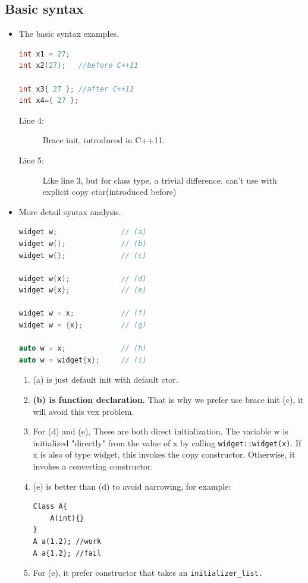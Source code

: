 \documentclass[a4paper,11pt,twoside]{book}
\begin{document}
\subsection{Basic syntax}
\begin{itemize}
	
	\item The basic syntax examples. 
\begin{lstlisting}[frame=single, language=c++,mathescape=true]
int x1 = 27;  
int x2(27);   //before C++11

int x3{ 27 }; //after C++11
int x4={ 27 }; 
\end{lstlisting}
\begin{description}
	\item[Line 4:] Brace init, introduced in C++11.
	\item[Line 5:] Like line 3, but for class type, a trivial difference. can't use with explicit copy ctor(introduced before)
\end{description}
	
\item More detail syntax analysis.
\begin{lstlisting}[frame=single, language=c++,mathescape=true]
widget w;               // (a)
widget w();             // (b)
widget w{};             // (c)
	
widget w(x);            // (d)
widget w{x};            // (e)
	
widget w = x;           // (f)
widget w = {x};         // (g)
	
auto w = x;             // (h)
auto w = widget{x};     // (i)
\end{lstlisting}
	
	\begin{enumerate}
		\item (a) is just default init with default ctor.
		
		\item \textbf{(b) is function declaration.} That is why we prefer use brace init (c), it will avoid this vex problem.
		
		\item For (d) and (e), These are both direct initialization. The variable w is initialized "directly" from the value of x by calling \texttt{widget::widget(x)}. If x is also of type widget, this invokes the copy constructor. Otherwise, it invokes a converting constructor.
		
		\item (e) is better than (d) to avoid narrowing, for example:
\begin{lstlisting}[numbers=none]
Class A{
	A(int){}
}
A a(1.2); //work
A a{1.2}; //fail
\end{lstlisting}
		\item For (e), it prefer constructor that takes an \texttt{initializer\_list.}
		

\end{enumerate}
\end{itemize}
\end{document}
